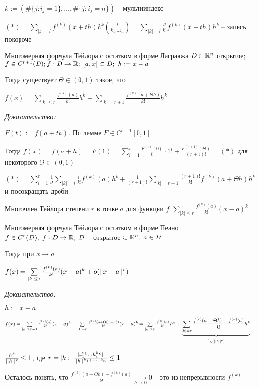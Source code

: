 \documentclass[12pt]{article}
\begin{document}
$k := \left(\#\{j : i_j = 1\}, \ldots, \#\{j : i_j = n\}\right)$ -- мультииндекс

$(*) = \sum\limits_{|k| = l} f^{(k)}(x + th)h^k{l \choose k_1 \ldots k_n} = \sum\limits_{|k| = l} \frac{l!}{k!}f^{(k)}(x + th)h^k$ -- запись покороче

\begin{theo}{Многомерная формула Тейлора с остатком в форме Лагранжа}
    $D \in \mathbb R^n$ открытое; $f \in C^{r + 1}(D); f : D \to \mathbb R;\ [a, x] \subset D;\ h := x - a$

    Тогда существует $\Theta \in (0, 1)$ такое, что 

    $f(x) = \sum\limits_{|k| \leq r} \frac{f^{(k)}(a)}{k!}h^k + \sum\limits_{|k| = r + 1} \frac{f^{(k)}(a + \Theta h)}{k!}h^k$
\end{theo}

\textit{Доказательство:}

$F(t) := f(a + th)$. По лемме $F \in C^{r + 1}[0, 1]$

Тогда $f(x) = f(a + h) = F(1) = \sum\limits_{i = 1}^r \frac{F^{(i)}(0)}{i!} \cdot 1^i + \frac{F^{(r + 1)}(\Theta)}{(r + 1)!} = (*)$ для некоторого $\Theta \in (0, 1)$

$(*) = \sum\limits_{i = 1}^r \frac{1}{i!}\sum\limits_{|k| = i} \frac{i!}{k!}f^{(k)}(a)h^k + \frac{1}{(r + 1)!} \sum\limits_{|k| = r + 1} \frac{(r + 1)!}{k!}f^{(k)}(a + \Theta h)h^k$ и посокращать дроби 

\begin{defin}{Многочлен Тейлора степени $r$ в точке $a$ для функции $f$}
    $\sum\limits_{|k| \leq r} \frac{f^{(k)}(a)}{k!}(x - a)^k$
\end{defin}

\begin{theo}{Многомерная формула Тейлора с остатком в форме Пеано}
    $f \in C^r(D);\ f : D \to \mathbb R;\ D$ -- открытое $\subset \mathbb R^n;\ a \in D$

    Тогда при $x \to a$

    $f(x) = \sum\limits_{|k| \leq r} \frac{f^{(k)}(a)}{k!}(x - a)^k + o(|| x - a ||^r)$
\end{theo}

\textit{Доказательство:}

$h := x - a$

$f(x) = \sum\limits_{|k| \leq r - 1} \frac{f^{(k)}(a)}{k!}(x - a)^k + \sum\limits_{|k| = r} \frac{f^{(k)}(a + \Theta(x - a))}{k!}(x - a)^k = \sum\limits_{|k| \leq r} \frac{f^{(k)}(a)}{k!}h^k + \underbrace{\sum\limits_{|k| = r} \frac{f^{(k)}(a + \Theta h) - f^{(k)}(a)}{k!}h^k}_{\stackrel{?}{=} o(|| h ||^r)}$

$\frac{|h^k|}{|| h ||^r} \leq 1$, где $r = |k|;\ \frac{|h_1^{k_1} \ldots h_n^{k_n}|}{|| h ||^{k_1 + \ldots + k_n}} \leq 1$

Осталось понять, что $\frac{f^{(k)}(a + \Theta h) - f^{(k)}(a)}{k!} \xrightarrow[h \to 0]{} 0$ -- это из непрерывности $f^{(k)}$
\end{document}
